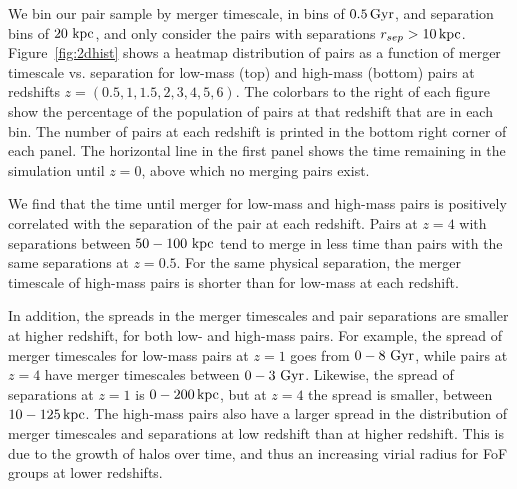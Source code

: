 \documentclass[twocolumn,linenumbers]{aastex631}
\begin{document}
    We bin our pair sample by merger timescale, in bins of $0.5\mathrm{\,Gyr}$, and separation bins of $20\,\mathrm{\,kpc}$, and only consider the pairs with separations $r_{sep}>10\mathrm{\,kpc}$.
    Figure~\ref{fig:2dhist} shows a heatmap distribution of pairs as a function of merger timescale vs. separation for low-mass (top) and high-mass (bottom) pairs at redshifts $z=(0.5,1,1.5,2,3,4,5,6)$. 
    The colorbars to the right of each figure show the percentage of the population of pairs at that redshift that are in each bin.
    The number of pairs at each redshift is printed in the bottom right corner of each panel.
    The horizontal line in the first panel shows the time remaining in the simulation until $z=0$, above which no merging pairs exist.
    
    We find that the time until merger for low-mass and high-mass pairs is positively correlated with the separation of the pair at each redshift. 
    Pairs at $z=4$ with separations between $50-100\,\mathrm{\,kpc}$ tend to merge in less time than pairs with the same separations at $z=0.5$. 
    For the same physical separation, the merger timescale of high-mass pairs is shorter than for low-mass at each redshift. 
    
    In addition, the spreads in the merger timescales and pair separations are smaller at higher redshift, for both low- and high-mass pairs. 
    For example, the spread of merger timescales for low-mass pairs at $z=1$ goes from $0-8\,\mathrm{\,Gyr}$, while pairs at $z=4$ have merger timescales between $0-3\,\mathrm{\,Gyr}$. 
    Likewise, the spread of separations at $z=1$ is $0-200\mathrm{\,kpc}$, but at $z=4$ the spread is smaller, between $10-125\mathrm{\,kpc}$. 
    The high-mass pairs also have a larger spread in the distribution of merger timescales and separations at low redshift than at higher redshift.
    This is due to the growth of halos over time, and thus an increasing virial radius for FoF groups at lower redshifts. 
    
    
    
\end{document}
